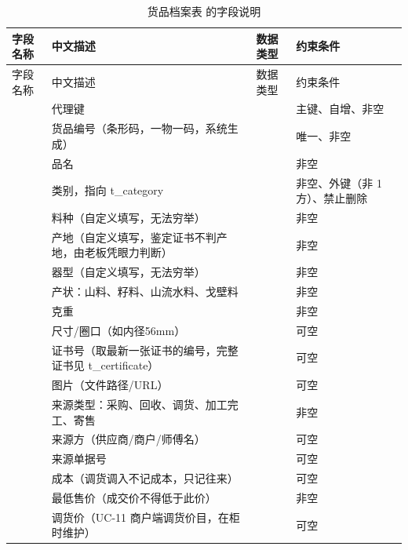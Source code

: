 \begin{longtable}{@{}L{3.5cm} L{4.1cm} L{2.9cm} L{4.0cm}@{}}
\caption{货品档案表  的字段说明}\label{tab:f-t-goods}\\
\toprule
字段名称 & 中文描述 & 数据类型 & 约束条件 \\
\midrule
\endfirsthead
\toprule
字段名称 & 中文描述 & 数据类型 & 约束条件 \\
\midrule
\endhead
\bottomrule
\endlastfoot
{} & 代理键 &  & 主键、自增、非空 \\
 & 货品编号（条形码，一物一码，系统生成） &  & 唯一、非空 \\
 & 品名 &  & 非空 \\
 & 类别，指向 t\_category &  & 非空、外键（非 1 方）、禁止删除 \\
 & 料种（自定义填写，无法穷举） &  & 非空 \\
 & 产地（自定义填写，鉴定证书不判产地，由老板凭眼力判断） &  & 非空 \\
 & 器型（自定义填写，无法穷举） &  & 非空 \\
 & 产状：山料、籽料、山流水料、戈壁料 &  & 非空 \\
 & 克重 &  & 非空 \\
 & 尺寸/圈口（如内径56mm） &  & 可空 \\
 & 证书号（取最新一张证书的编号，完整证书见 t\_certificate） &  & 可空 \\
 & 图片（文件路径/URL） &  & 可空 \\
 & 来源类型：采购、回收、调货、加工完工、寄售 &  & 非空 \\
 & 来源方（供应商/商户/师傅名） &  & 可空 \\
 & 来源单据号 &  & 可空 \\
 & 成本（调货调入不记成本，只记往来） &  & 可空 \\
 & 最低售价（成交价不得低于此价） &  & 非空 \\
 & 调货价（UC-11 商户端调货价目，在柜时维护） &  & 可空 \\

\end{longtable}
